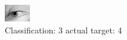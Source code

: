 \begin{figure}[h!]
\begin{center}
\includegraphics[width=0.60\columnwidth]{figures/ID3035_class_3_target_4.png}
\end{center}
\caption{ Classification: 3 actual target: 4}
\label{fig:ID3035_class_3_target_4}
\end{figure}
